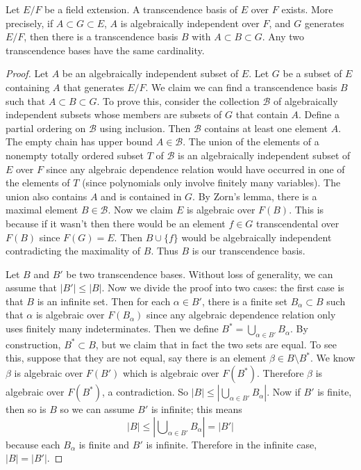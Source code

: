 \begin{lemma}
\label{lemma-transcendence-degree}
Let $E/F$ be a field extension. A transcendence basis of $E$ over $F$ exists.
More precisely, if $A\subset G\subset E$, $A$ is algebraically independent
over $F$, and $G$ generates $E/F$, then there is a transcendence basis $B$
with $A\subset B\subset G$.
Any two transcendence bases have the same cardinality.
\end{lemma}

\begin{proof}
Let $A$ be an algebraically independent subset of $E$. Let $G$ be a subset
of $E$ containing $A$ that generates $E/F$. We claim we can find a
transcendence basis $B$ such that $A \subset B \subset G$.
To prove this, consider the collection $\mathcal{B}$ of algebraically
independent subsets whose members are subsets of $G$ that contain $A$.
Define a partial ordering on $\mathcal{B}$ using inclusion.
Then $\mathcal{B}$ contains at least one element $A$.
The empty chain has upper bound $A\in\mathcal{B}$.
The union of the elements of a nonempty totally ordered subset $T$ of $\mathcal{B}$
is an algebraically independent subset of $E$ over $F$ since any algebraic
dependence relation would have occurred in one of the elements of $T$
(since polynomials only involve finitely many variables). The union also
contains $A$ and is contained in $G$. By Zorn's lemma, there is a maximal
element $B \in \mathcal{B}$. Now we claim $E$ is algebraic over $F(B)$.
This is because if it wasn't then there would be an element
$f \in G$ transcendental over $F(B)$ since $F(G) = E$. Then
$B \cup\{f\}$ would be algebraically independent contradicting the
maximality of $B$. Thus $B$ is our transcendence basis.

\medskip\noindent
Let $B$ and $B'$ be two transcendence bases. Without loss of generality, we
can assume that $|B'| \leq |B|$. Now we divide the proof into two cases: the
first case is that $B$ is an infinite set. Then for each $\alpha \in B'$,
there is a finite set $B_{\alpha} \subset B$ such that $\alpha$ is algebraic
over
$F(B_{\alpha})$ since any algebraic dependence relation only uses finitely many
indeterminates. Then we define $B^* = \bigcup_{\alpha\in B'} B_{\alpha}$.
By construction, $B^* \subset B$, but we claim that in fact the two sets are
equal. To see this, suppose that they are not equal, say there is an element
$\beta \in B \setminus B^*$. We know $\beta$ is algebraic over $F(B')$ which
is algebraic over $F(B^*)$. Therefore $\beta$ is algebraic over $F(B^*)$, a
contradiction. So $|B| \leq |\bigcup_{\alpha \in B'} B_{\alpha}|$.
Now if $B'$ is finite, then so is $B$ so we can assume $B'$ is infinite;
this means
$$
|B| \leq |\bigcup\nolimits_{\alpha \in B'} B_{\alpha}| = |B'|
$$
because each $B_\alpha$ is finite and $B'$ is infinite. Therefore in the
infinite case, $|B| = |B'|$.


\end{proof}
